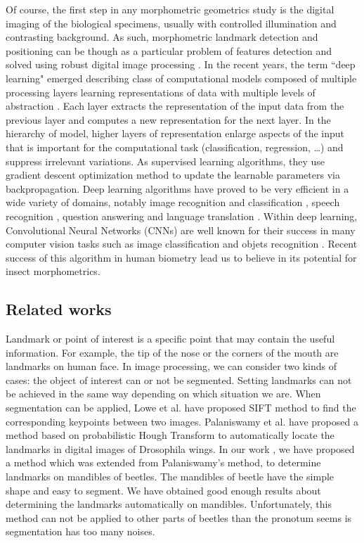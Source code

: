 \documentclass[review]{elsarticle}
\begin{document}
Of course, the first step in any morphometric geometrics study is the digital imaging of the biological specimens, usually with controlled illumination and contrasting background. As such, morphometric landmark detection and positioning can be though as a particular problem of features detection and solved using robust digital image processing \cite{gonzalez_digital_2006}. In the recent years, the term ``deep learning" emerged describing class of computational models composed of multiple processing layers learning representations of data with multiple levels of abstraction \cite{lecun2015deep}. Each layer extracts the representation of the input data from the previous layer and computes a new representation for the next layer. In the hierarchy of model, higher layers of representation enlarge aspects of the input that is important for the computational task (classification, regression, \ldots) and suppress irrelevant variations. As supervised learning algorithms, they use gradient descent optimization method to update the learnable parameters via backpropagation. Deep learning algorithms have proved to be very efficient in a wide variety of domains, notably image recognition and classification \cite{krizhevsky2012imagenet, ciregan2012multi, szegedy2015going}, speech recognition \cite{mikolov2011strategies, hinton2012deep, sainath2013deep}, question answering \cite{bordes2014question} and language translation \cite{sutskever2014sequence, jean2014using}.
Within deep learning, Convolutional Neural Networks (CNNs) are well known for their success in many computer vision tasks such as image classification \cite{krizhevsky2012imagenet,ciregan2012multi} and  objets recognition \cite{li2015convolutional,tompson2014joint}.
Recent success of this algorithm in human biometry \cite{cintas2016automatic} lead us to believe in its potential for insect morphometrics.  

\subsection{Related works}\label{rw}

Landmark or point of interest is a specific point that may contain the useful information. For example, the tip of the nose or the corners of the mouth are landmarks on human face. In image processing, we can consider two kinds of cases: the object of interest can or not be segmented. Setting landmarks can not be achieved in the same way depending on which situation we are. When segmentation can be applied, Lowe et al. \cite{lowe2004distinctive} have proposed SIFT method to find the corresponding keypoints between two images. Palaniswamy et al. \cite{palaniswamy2010automatic} have proposed a method based on probabilistic Hough Transform to automatically locate the landmarks in digital images of Drosophila wings. In our work \cite{le2017maelab}, we have proposed a method which was extended from Palaniswamy's method, to determine landmarks on mandibles of beetles. The mandibles of beetle have the simple shape and easy to segment. We have obtained good enough results about determining the landmarks automatically on mandibles. Unfortunately, this method can not be applied to other parts of beetles than the pronotum seems is segmentation has too many noises.
\end{document}
